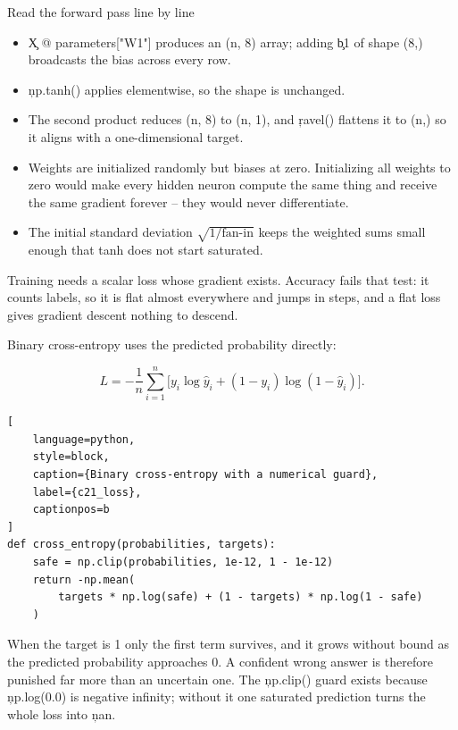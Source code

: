 \begin{SyntaxBox}{Read the forward pass line by line}
\begin{itemize}
    \item \c{X @ parameters["W1"]} produces an (n, 8) array; adding \c{b1} of
          shape (8,) broadcasts the bias across every row.
    \item \c{np.tanh()} applies elementwise, so the shape is unchanged.
    \item The second product reduces (n, 8) to (n, 1), and \c{ravel()} flattens
          it to (n,) so it aligns with a one-dimensional target.
    \item Weights are initialized randomly but biases at zero. Initializing all
          weights to zero would make every hidden neuron compute the same thing
          and receive the same gradient forever -- they would never differentiate.
    \item The initial standard deviation $\sqrt{1/\text{fan-in}}$ keeps the
          weighted sums small enough that tanh does not start saturated.
\end{itemize}
\end{SyntaxBox}


Training needs a scalar loss whose gradient exists. Accuracy fails that test: it
counts labels, so it is flat almost everywhere and jumps in steps, and a flat
loss gives gradient descent nothing to descend.

Binary cross-entropy uses the predicted probability directly:

\[
L = -\frac{1}{n}\sum_{i=1}^{n}\Big[y_i\log \hat{y}_i + (1-y_i)\log(1-\hat{y}_i)\Big].
\]

\begin{lstlisting}[
    language=python,
    style=block,
    caption={Binary cross-entropy with a numerical guard},
    label={c21_loss},
    captionpos=b
]
def cross_entropy(probabilities, targets):
    safe = np.clip(probabilities, 1e-12, 1 - 1e-12)
    return -np.mean(
        targets * np.log(safe) + (1 - targets) * np.log(1 - safe)
    )
\end{lstlisting}

When the target is 1 only the first term survives, and it grows without bound as
the predicted probability approaches 0. A confident wrong answer is therefore
punished far more than an uncertain one. The \c{np.clip()} guard exists because
\c{np.log(0.0)} is negative infinity; without it one saturated prediction turns
the whole loss into \c{nan}.

